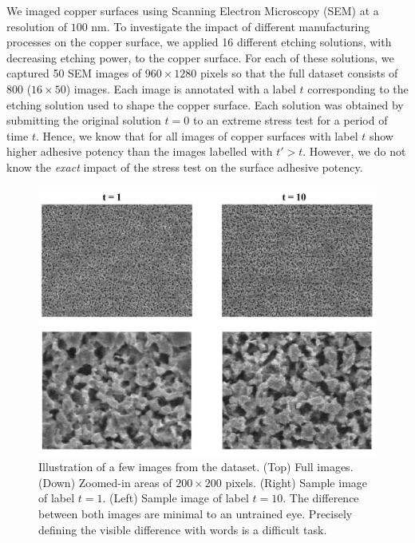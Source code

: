 \documentclass[10pt,twocolumn,letterpaper]{article}
\begin{document}
We imaged copper surfaces using Scanning Electron Microscopy (SEM) at a resolution of $100$ nm.
To investigate the impact of different manufacturing processes on the copper surface, 
we applied 16 different etching solutions, with decreasing etching power, to the copper surface.
For each of these solutions, we captured 50 SEM images of $960 \times 1280$ pixels so that the full dataset
consists of $800$ ($16 \times 50$) images.
Each image is annotated with a label $t$ corresponding to the etching solution used to shape the copper surface.
Each solution was obtained by submitting the original solution $t=0$ to an extreme stress test for a period of time $t$.
Hence, we know that for all images of copper surfaces with label $t$ show higher adhesive potency than the images labelled with $t' > t$. 
However, we do not know the \textit{exact} impact of the stress test on the surface adhesive potency.

\begin{figure}[h]
\centering
\includegraphics[width=0.9\linewidth]{"./figures/Figure3"}
\caption{
Illustration of a few images from the dataset. 
(Top) Full images. 
(Down) Zoomed-in areas of $200 \times 200$ pixels. 
(Right) Sample image of label $t=1$. 
(Left) Sample image of label $t=10$. 
The difference between both images are minimal to an untrained eye.
Precisely defining the visible difference with words is a difficult task.
}
\end{figure}
\end{document}
